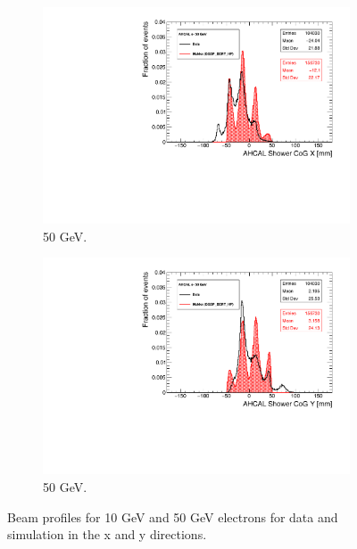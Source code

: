 \begin{figure}[htbp!]
\begin{subfigure}[t]{0.49\textwidth}
    \includegraphics[width=1.\linewidth]{chap5/fig_AHCAL_Timing/Electrons/Run24405_CoGX_AHCAL_50GeV_Comparison.pdf}
    \caption{50 GeV.} \label{fig:e50GeVX}
  \end{subfigure}
  \hfill
  \begin{subfigure}[t]{0.49\textwidth}
    \includegraphics[width=1.\linewidth]{chap5/fig_AHCAL_Timing/Electrons/Run24405_CoGY_AHCAL_50GeV_Comparison.pdf}
    \caption{50 GeV.} \label{fig:e50GeVY}
  \end{subfigure}
  \caption{Beam profiles for 10 GeV and 50 GeV electrons for data and simulation in the x and y directions.}
  \label{fig:BPe}
\end{figure}

